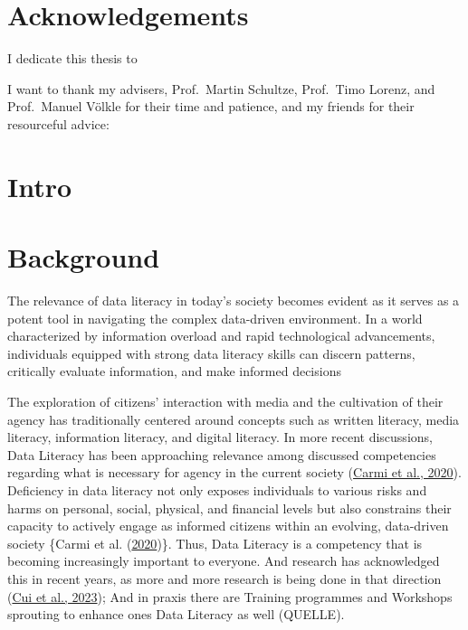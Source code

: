\documentclass[
  12pt,
  a4paper,
  twoside]{article}
\begin{document}
\hypertarget{acknowledgements}{%
\section*{Acknowledgements}\label{acknowledgements}}

I dedicate this thesis to

I want to thank my advisers, Prof.~Martin Schultze, Prof.~Timo Lorenz, and Prof.~Manuel Völkle for their time and patience, and my friends for their resourceful advice:

\newpage\null\thispagestyle{empty}\newpage

\hypertarget{intro}{%
\section{Intro}\label{intro}}

\hypertarget{background}{%
\section{Background}\label{background}}

The relevance of data literacy in today's society becomes evident as it serves as a potent tool in navigating the complex data-driven environment. In a world characterized by information overload and rapid technological advancements, individuals equipped with strong data literacy skills can discern patterns, critically evaluate information, and make informed decisions

The exploration of citizens' interaction with media and the cultivation of their agency has traditionally centered around concepts such as written literacy, media literacy, information literacy, and digital literacy. In more recent discussions, Data Literacy has been approaching relevance among discussed competencies regarding what is necessary for agency in the current society (\protect\hyperlink{ref-Carmi2020}{Carmi et al., 2020}). Deficiency in data literacy not only exposes individuals to various risks and harms on personal, social, physical, and financial levels but also constrains their capacity to actively engage as informed citizens within an evolving, data-driven society \{Carmi et al. (\protect\hyperlink{ref-Carmi2020}{2020})\}. Thus, Data Literacy is a competency that is becoming increasingly important to everyone. And research has acknowledged this in recent years, as more and more research is being done in that direction (\protect\hyperlink{ref-Cui2023}{Cui et al., 2023}); And in praxis there are Training programmes and Workshops sprouting to enhance ones Data Literacy as well (QUELLE).
\end{document}
